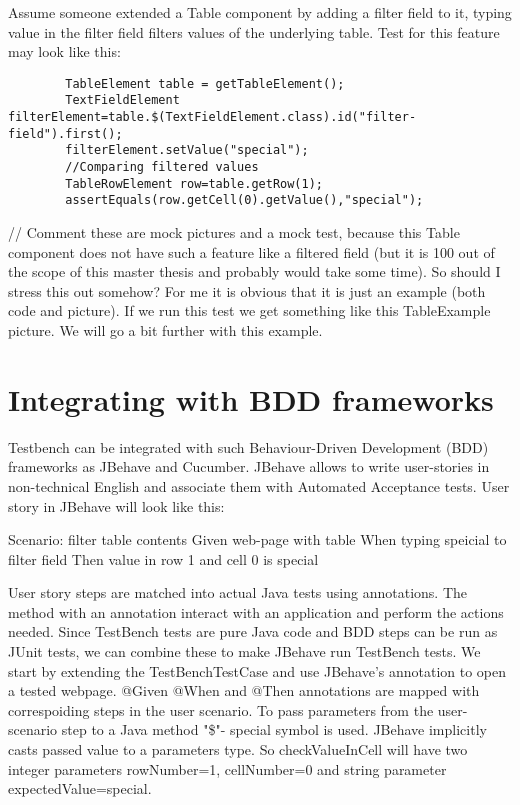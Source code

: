   Assume someone extended a Table component by adding a filter field to it,
  typing value in the filter field filters values of the underlying table. 
  Test for this feature may look like this:
  	\lstset{language=Java}
  	\begin{lstlisting}
		TableElement table = getTableElement();
		TextFieldElement filterElement=table.$(TextFieldElement.class).id("filter-field").first();
		filterElement.setValue("special");
		//Comparing filtered values
		TableRowElement row=table.getRow(1);
		assertEquals(row.getCell(0).getValue(),"special");
	\end{lstlisting}	
	
// Comment these are mock pictures and a mock test, 
because this Table component does not have such a feature like a filtered
 field (but it is 100%
  out of the scope of this master thesis and probably would take some time).
  So should I stress this out somehow? For me it is obvious that it is just an example (both code and picture).
 If we run this test we get something like this TableExample picture. We will go a bit further with this example.

\section{Integrating with BDD frameworks}

Testbench can be integrated with such Behaviour-Driven Development (BDD) frameworks as JBehave and Cucumber. 
JBehave allows to write user-stories in non-technical English and associate them with Automated Acceptance tests. 
User story in JBehave will look like this:

Scenario: filter table contents
Given web-page with table
When typing speicial to filter field
Then value in row 1 and cell 0 is special

User story steps are matched into actual Java tests using annotations. 
 The method with an annotation interact with an application and perform the actions needed.
  Since TestBench tests are pure Java code and BDD steps can be run as JUnit tests, we can combine these to make
   JBehave run TestBench tests. We start by extending the TestBenchTestCase  and use JBehave's \@BeforeScenario
   annotation to open a tested webpage.
   @Given @When and @Then annotations are mapped with correspoiding steps in the user scenario.
   To pass parameters from the user-scenario step to a Java method "\$"- special symbol is used.
    JBehave implicitly casts passed value to a parameters type.
    So checkValueInCell will have two integer parameters rowNumber=1, cellNumber=0 and string parameter expectedValue=special. 

